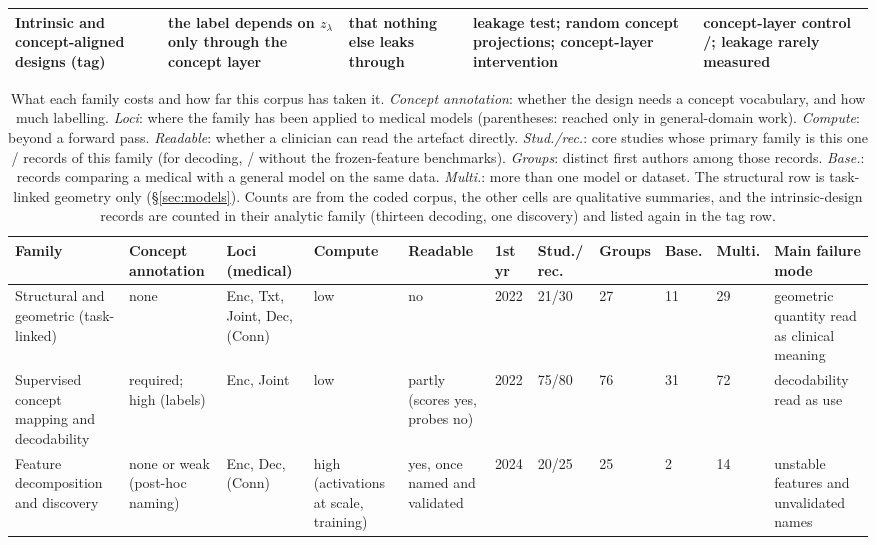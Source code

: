\begin{table}[!tb]
\begin{tabular}{@{}L{2.3cm}L{3.4cm}L{2.8cm}L{3.25cm}L{3.25cm}@{}}
\midrule
\textbf{Intrinsic and concept-aligned designs} (tag) & the label depends on $z_\lambda$ only through the concept layer & that nothing else leaks through & leakage test; random concept projections; concept-layer intervention & concept-layer control \Vintrany{}/\Vintrn{}; leakage rarely measured \\
\bottomrule
\end{tabular}
\end{table}
\begin{table}[!tb]
\centering\footnotesize\setlength\tabcolsep{2.5pt}\renewcommand{\arraystretch}{1.05}
\caption{What each family costs and how far this corpus has taken it. \emph{Concept annotation}: whether
the design needs a concept vocabulary, and how much labelling. \emph{Loci}: where the family has been
applied to medical models (parentheses: reached only in general-domain work). \emph{Compute}: beyond a
forward pass. \emph{Readable}: whether a clinician can read the artefact directly. \emph{Stud./rec.}:
core studies whose primary family is this one / records of this family (for decoding,
\Ndecstudnb{}/\Ndecrecnb{} without the \Nbenchdec{} frozen-feature benchmarks). \emph{Groups}: distinct
first authors among those records. \emph{Base.}: records comparing a medical with a general model on the
same data. \emph{Multi.}: more than one model or dataset. The structural row is task-linked geometry only
(\S\ref{sec:models}). Counts are from the coded corpus, the other cells are qualitative summaries, and the \Nintrinsic{} intrinsic-design records are counted in their analytic family (thirteen decoding, one
discovery) and listed again in the tag row.}
\label{tab:famreq}
\begin{tabular}{@{}L{1.86cm}L{1.75cm}L{1.76cm}L{1.33cm}L{1.53cm}C{0.6cm}C{0.89cm}C{0.92cm}C{0.72cm}C{0.75cm}L{2.2cm}@{}}
\toprule
Family & Concept annotation & Loci (medical) & Compute & Readable & 1st yr & Stud./ rec. & Groups & Base. & Multi. & Main failure mode \\
\midrule
Structural and geometric (task-linked) & none & Enc, Txt, Joint, Dec, (Conn) & low & no & 2022 & 21/30 & 27 & 11 & 29 & geometric quantity read as clinical meaning \\
Supervised concept mapping and decodability & required; high (labels) & Enc, Joint & low & partly (scores yes, probes no) & 2022 & 75/80 & 76 & 31 & 72 & decodability read as use \\
Feature decomposition and discovery & none or weak (post-hoc naming) & Enc, Dec, (Conn) & high (activations at scale, training) & yes, once named and validated & 2024 & 20/25 & 25 & 2 & 14 & unstable features and unvalidated names \\

\end{tabular}
\end{table}
